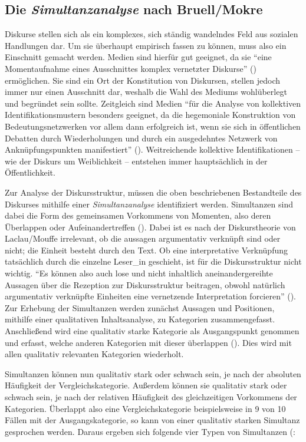 \documentclass[12pt, titlepage=true, toc=bib]{scrartcl}
\begin{document}
\subsection{Die \textit{Simultanzanalyse} nach Bruell/Mokre}

Diskurse stellen sich als ein komplexes, sich ständig wandelndes Feld aus sozialen Handlungen dar. Um sie überhaupt empirisch fassen zu können, muss also ein Einschnitt gemacht werden. Medien sind hierfür gut geeignet, da sie "`eine Momentaufnahme eines Ausschnittes komplex vernetzter Diskurse"' (\cite[8]{bruell_chancen_2006}) ermöglichen. Sie sind ein Ort der Konstitution von Diskursen, stellen jedoch immer nur einen Ausschnitt dar, weshalb die Wahl des Mediums wohlüberlegt und begründet sein sollte. Zeitgleich sind Medien "`für die Analyse von kollektiven Identifikationsmustern besonders geeignet, da die hegemoniale Konstruktion von Bedeutungsnetzwerken vor allem dann erfolgreich ist, wenn sie sich in öffentlichen Debatten durch Wiederholungen und durch ein ausgedehntes Netzwerk von Anknüpfungspunkten manifestiert"' (\cite[202]{nonhoff_kollektive_2007}). Weitreichende kollektive Identifikationen -- wie der Diskurs um Weiblichkeit -- entstehen immer hauptsächlich in der Öffentlichkeit. 

Zur Analyse der Diskursstruktur, müssen die oben beschriebenen Bestandteile des Diskurses mithilfe einer \textit{Simultanzanalyse} identifiziert werden. Simultanzen sind dabei die Form des gemeinsamen Vorkommens von Momenten, also deren Überlappen oder Aufeinandertreffen (\cite[11][vgl.]{bruell_chancen_2006}). Dabei ist es nach der Diskurstheorie von Laclau/Mouffe irrelevant, ob die aussagen argumentativ verknüpft sind oder nicht; die Einheit besteht durch den Text. Ob eine interpretative Verknüpfung tatsächlich durch die einzelne Leser\_in geschieht, ist für die Diskursstruktur nicht wichtig. "`Es können also auch lose und nicht inhaltlich aneinandergereihte Aussagen über die Rezeption zur Diskursstruktur beitragen, obwohl natürlich argumentativ verknüpfte Einheiten eine vernetzende Interpretation forcieren"' (\cite[9]{bruell_chancen_2006}). Zur Erhebung der Simultanzen werden zunächst Aussagen und Positionen, mithilfe einer qualitativen Inhaltsanalyse, zu Kategorien zusammengefasst. Anschließend wird eine qualitativ starke Kategorie als Ausgangspunkt genommen und erfasst, welche anderen Kategorien mit dieser überlappen (\cite[vgl.][205]{nonhoff_kollektive_2007}). Dies wird mit allen qualitativ relevanten Kategorien wiederholt.

Simultanzen können nun qualitativ stark oder schwach sein, je nach der absoluten Häufigkeit der Vergleichskategorie. Außerdem können sie qualitativ stark oder schwach sein, je nach der relativen Häufigkeit des gleichzeitigen Vorkommens der Kategorien. Überlappt also eine Vergleichskategorie beispielsweise in 9 von 10 Fällen mit der Ausgangskategorie, so kann von einer qualitativ starken Simultanz gesprochen werden. Daraus ergeben sich folgende vier Typen von Simultanzen (\cite[vgl.][12]{bruell_chancen_2006}:
\end{document}
